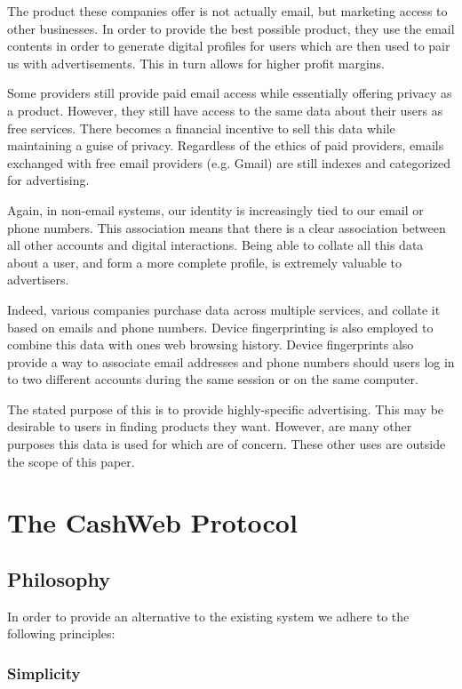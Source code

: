 \documentclass{article}
\begin{document}
The product these companies offer is not actually email, but marketing access to other businesses. In order to provide the best possible product, they use the email contents in order to generate digital profiles for users which are then used to pair us with advertisements. This in turn allows for higher profit margins.

Some providers still provide paid email access while essentially offering privacy as a product. However, they still have access to the same data about their users as free services. There becomes a financial incentive to sell this data while maintaining a guise of privacy. Regardless of the ethics of paid providers, emails exchanged with free email providers (e.g. Gmail) are still indexes and categorized for advertising.

Again, in non-email systems, our identity is increasingly tied to our email or phone numbers. This association means that there is a clear association between all other accounts and digital interactions. Being able to collate all this data about a user, and form a more complete profile, is extremely valuable to advertisers.

Indeed, various companies purchase data across multiple services, and collate it based on emails and phone numbers. Device fingerprinting is also employed to combine this data with ones web browsing history. Device fingerprints also provide a way to associate email addresses and phone numbers should users log in to two different accounts during the same session or on the same computer.

The stated purpose of this is to provide highly-specific advertising. This may be desirable to users in finding products they want. However, are many other purposes this data is used for which are of concern. These other uses are outside the scope of this paper.

\section{The CashWeb Protocol}

\subsection{Philosophy}

In order to provide an alternative to the existing system we adhere to the following principles:

\subsubsection{Simplicity}
\end{document}
